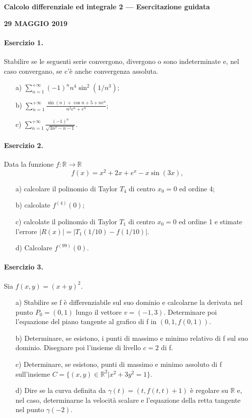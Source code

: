\documentclass[a4paper, 10pt]{article}
\newcommand{\sectiontitle}[1]{\begin{center}\large\bfseries #1\end{center}}
\newcommand{\exercisecenter}[1]{\begin{center}\bfseries #1\end{center}}
\begin{document}
\sectiontitle{Calcolo differenziale ed integrale 2 --- Esercitazione guidata}
\exercisecenter{29 MAGGIO 2019}

\paragraph{Esercizio 1.} Stabilire se le seguenti serie convergono, divergono o sono indeterminate e, nel caso convergano, se c'è anche convergenza assoluta.
\begin{enumerate}
    \item[a)] $\displaystyle \sum_{n=1}^{+\infty}(-1)^{n}n^{4}\sin^2(1/n^{3});$
    \item[b)] $\displaystyle \sum_{n=1}^{+\infty}\frac{\sin(n)+\cos n+5+ne^{n}}{n^{2}e^{n}+e^{n}};$
    \item[c)] $\displaystyle \sum_{n=1}^{+\infty}\frac{(-1)^{n}}{\sqrt{3n^{2}-n-1}}.$
\end{enumerate}

\paragraph{Esercizio 2.} Data la funzione $f:\mathbb{R}\rightarrow\mathbb{R}$
\[ f(x)=x^{2}+2x+e^{x}-x \sin(3x), \]
\begin{enumerate}
    \item[a)] calcolare il polinomio di Taylor $T_{4}$ di centro $x_{0}=0$ ed ordine 4;
    \item[b)] calcolate $f^{(4)}(0)$;
    \item[c)] calcolate il polinomio di Taylor $T_{1}$ di centro $x_{0}=0$ ed ordine 1 e stimate l'errore $|R(x)|=|T_{1}(1/10)-f(1/10)|.$
    \item[d)] Calcolare $f^{(99)}(0).$
\end{enumerate}

\paragraph{Esercizio 3.} Sia $f(x,y)=(x+y)^{2}.$
\begin{enumerate}
    \item[a)] Stabilire se f è differenziabile sul suo dominio e calcolarne la derivata nel punto $P_{0}=(0,1)$ lungo il vettore $v=(-1,3)$. Determinare poi l'equazione del piano tangente al grafico di f in $(0, 1, f(0,1))$.
    \item[b)] Determinare, se esistono, i punti di massimo e minimo relativo di f sul suo dominio. Disegnare poi l'insieme di livello $c=2$ di f.
    \item[c)] Determinare, se esistono, punti di massimo e minimo assoluto di f sull'insieme $C=\{(x,y)\in\mathbb{R}^{2}|x^{2}+3y^{2}=1\}$.
    \item[d)] Dire se la curva definita da $\gamma(t)=(t,f(t,t)+1)$ è regolare su $\mathbb{R}$ e, nel caso, determinarne la velocità scalare e l'equazione della retta tangente nel punto $\gamma(-2)$.
\end{enumerate}
\end{document}
